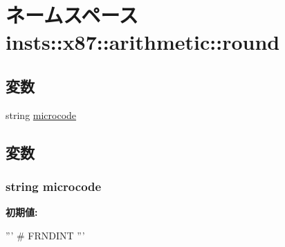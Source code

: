 \hypertarget{namespaceinsts_1_1x87_1_1arithmetic_1_1round}{
\section{ネームスペース insts::x87::arithmetic::round}
\label{namespaceinsts_1_1x87_1_1arithmetic_1_1round}
}
\subsection*{変数}
\begin{DoxyCompactItemize}
\item 
string \hyperlink{namespaceinsts_1_1x87_1_1arithmetic_1_1round_a770f11a173e99389a8802f0107ed8f52}{microcode}
\end{DoxyCompactItemize}


\subsection{変数}
\hypertarget{namespaceinsts_1_1x87_1_1arithmetic_1_1round_a770f11a173e99389a8802f0107ed8f52}{
\subsubsection[{microcode}]{\setlength{\rightskip}{0pt plus 5cm}string {\bf microcode}}}
\label{namespaceinsts_1_1x87_1_1arithmetic_1_1round_a770f11a173e99389a8802f0107ed8f52}
{\bfseries 初期値:}
\begin{DoxyCode}
'''
# FRNDINT
'''
\end{DoxyCode}
